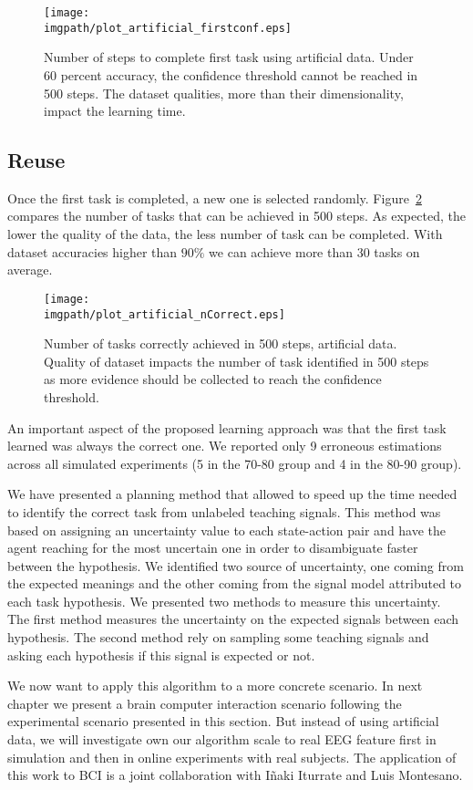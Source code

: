 \begin{figure}[!ht]
  \centering
      \texttt{[image: \\imgpath/plot\_artificial\_firstconf.eps]}
      \caption{Number of steps to complete first task using artificial data. Under 60 percent accuracy, the confidence threshold cannot be reached in 500 steps. The dataset qualities, more than their dimensionality, impact the learning time.}
      \label{fig:firstArtificial}
\end{figure} 

\subsection{Reuse}

Once the first task is completed, a new one is selected randomly. Figure~\ref{fig:nCorrectArtificial} compares the number of tasks that can be achieved in 500 steps. As expected, the lower the quality of the data, the less number of task can be completed. With dataset accuracies higher than $90\%$ we can achieve more than 30 tasks on average.

\begin{figure}[!ht]
    \centering
    \texttt{[image: \\imgpath/plot\_artificial\_nCorrect.eps]}
    \caption{Number of tasks correctly achieved in 500 steps, artificial data. Quality of dataset impacts the number of task identified in 500 steps as more evidence should be collected to reach the confidence threshold.}
    \label{fig:nCorrectArtificial}
\end{figure} 

An important aspect of the proposed learning approach was that the first task learned was always the correct one. We reported only 9 erroneous estimations across all simulated experiments (5 in the 70-80 group and 4 in the 80-90 group).


\transition

We have presented a planning method that allowed to speed up the time needed to identify the correct task from unlabeled teaching signals. This method was based on assigning an uncertainty value to each state-action pair and have the agent reaching for the most uncertain one in order to disambiguate faster between the hypothesis. We identified two source of uncertainty, one coming from the expected meanings and the other coming from the signal model attributed to each task hypothesis. We presented two methods to measure this uncertainty. The first method measures the uncertainty on the expected signals between each hypothesis. The second method rely on sampling some teaching signals and asking each hypothesis if this signal is expected or not.

We now want to apply this algorithm to a more concrete scenario. In next chapter we present a brain computer interaction scenario following the experimental scenario presented in this section. But instead of using artificial data, we will investigate own our algorithm scale to real EEG feature first in simulation and then in online experiments with real subjects. The application of this work to BCI is a joint collaboration with I{\~n}aki Iturrate and Luis Montesano.
